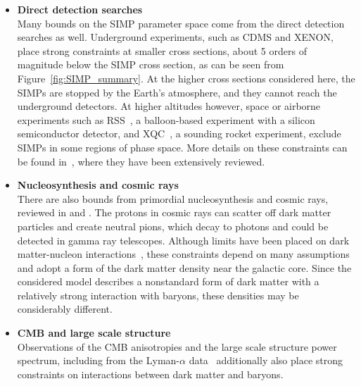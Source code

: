 \begin{itemize}
\item[] \textbf{Direct detection searches}\\
Many bounds on the \ac{SIMP} parameter space come from the direct detection searches as well. Underground experiments, such as CDMS and XENON,
place strong constraints at smaller cross sections, about 5 orders of magnitude below the \ac{SIMP} cross section, as can be seen from Figure~\ref{fig:SIMP_summary}. At the higher cross sections considered here, the \acp{SIMP} are stopped by the Earth's atmosphere, and they cannot reach the underground detectors. At higher altitudes however, space or airborne experiments such as RSS~\cite{Rich:1987st}, a balloon-based experiment with a silicon semiconductor detector, and XQC~\cite{Erickcek:2007jv}, a sounding rocket experiment, exclude \acp{SIMP} in some regions of phase space. More details on these constraints can be found in~\cite{Mack:2007xj}, where they have been extensively reviewed.

\item[] \textbf{Nucleosynthesis and cosmic rays}\\
There are also bounds from primordial nucleosynthesis and cosmic rays, reviewed in \cite{Mack:2012ju} and \cite{Cyburt:2002uw}. The protons in cosmic rays can scatter off dark matter particles and create neutral pions, which decay to photons and could be detected in gamma ray telescopes. Although limits have been placed on dark matter-nucleon interactions~\cite{Cyburt:2002uw}, these constraints depend on many assumptions and adopt a form of the dark matter density near the galactic core. Since the considered model describes a nonstandard form of dark matter with a relatively strong interaction with baryons, these densities may be considerably different.

\item[] \textbf{\ac{CMB} and large scale structure}\\
Observations of the \ac{CMB} anisotropies and the large scale structure power spectrum, including from the Lyman-$\alpha$ data~\cite{Chen:2002yh,Dvorkin:2013cea} additionally also place strong constraints on interactions between dark matter and baryons.


\end{itemize}
